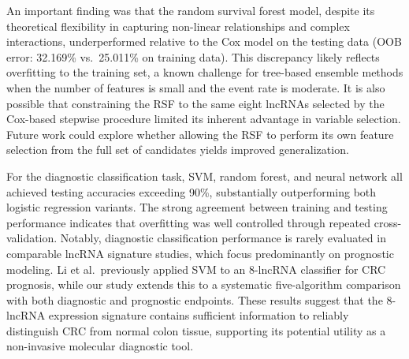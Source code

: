 \documentclass[fleqn,10pt]{wlscirep}
\begin{document}
An important finding was that the random survival forest model, despite its theoretical flexibility in capturing non-linear relationships and complex interactions, underperformed relative to the Cox model on the testing data (OOB error: 32.169\% vs.\ 25.011\% on training data). This discrepancy likely reflects overfitting to the training set, a known challenge for tree-based ensemble methods when the number of features is small and the event rate is moderate. It is also possible that constraining the RSF to the same eight lncRNAs selected by the Cox-based stepwise procedure limited its inherent advantage in variable selection. Future work could explore whether allowing the RSF to perform its own feature selection from the full set of candidates yields improved generalization.

For the diagnostic classification task, SVM, random forest, and neural network all achieved testing accuracies exceeding 90\%, substantially outperforming both logistic regression variants. The strong agreement between training and testing performance indicates that overfitting was well controlled through repeated cross-validation. Notably, diagnostic classification performance is rarely evaluated in comparable lncRNA signature studies, which focus predominantly on prognostic modeling. Li et al.\ previously applied SVM to an 8-lncRNA classifier for CRC prognosis, while our study extends this to a systematic five-algorithm comparison with both diagnostic and prognostic endpoints. These results suggest that the 8-lncRNA expression signature contains sufficient information to reliably distinguish CRC from normal colon tissue, supporting its potential utility as a non-invasive molecular diagnostic tool.
\end{document}

